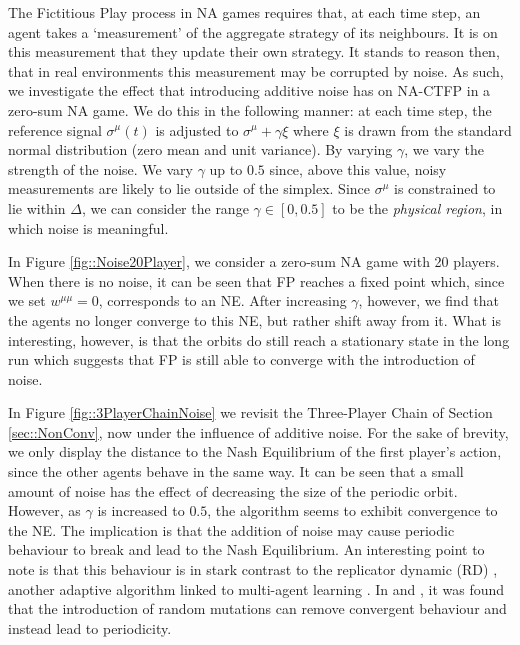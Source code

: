 \documentclass{article}
\theoremstyle{definition}
\newcommand{\refmu}{\sigma^{\mu}}
\begin{document}
  The Fictitious Play process in NA games requires that, at each time step, an agent takes a
  `measurement' of the aggregate strategy of its neighbours. It is on this measurement that they
  update their own strategy. It stands to reason then, that in real environments this measurement
  may be corrupted by noise. 
%  
  As such, we investigate the effect that introducing additive noise has
  on NA-CTFP in a zero-sum NA game. We do this in the following manner: at each time step, the
  reference signal $\refmu(t)$ is adjusted to $\refmu + \gamma \xi$ where $\xi$ is drawn from the
  standard normal distribution (zero mean and unit variance). By varying $\gamma$, we vary the
  strength of the noise. We vary $\gamma$ up to $0.5$ since, above this value, noisy measurements
  are likely to lie outside of the simplex. Since $\refmu$ is constrained to lie within $\Delta$, we
  can consider the range $\gamma \in [0, 0.5]$ to be the \emph{physical region}, in which noise is meaningful.

  In Figure \ref{fig::Noise20Player}, we consider a zero-sum NA game with 20 players. When there is
  no noise, it can be seen that FP reaches a fixed point which, since we set $w^{\mu \mu} = 0$,
  corresponds to an NE. After increasing $\gamma$, however, we find that the agents no longer
  converge to this NE, but rather shift away from it. What is interesting, however, is that the
  orbits do still reach a stationary state in the long run which suggests that FP is still able to
  converge with the introduction of noise.

  In Figure \ref{fig::3PlayerChainNoise} we revisit the Three-Player Chain of Section
  \ref{sec::NonConv}, now under the influence of additive noise. For the sake of brevity, we only
  display the distance to the Nash Equilibrium of the first player's action, since the other agents
  behave in the same way. It can be seen that a small amount of noise has the effect of decreasing
  the size of the periodic orbit. However, as $\gamma$
  is increased to $0.5$, the algorithm seems to exhibit convergence to the NE. The implication is
  that the addition of noise may cause periodic behaviour to break and lead to the Nash Equilibrium.
  An interesting point to note is that this behaviour is in stark contrast to the replicator
  dynamic (RD) \cite{Smith1982}, another adaptive algorithm linked to multi-agent learning
  \cite{Mertikopoulos2018}. In \cite{Imhof2005} and \cite{Galla2011}, it was found that the
  introduction of random mutations can remove convergent behaviour and instead lead to periodicity. 
  
\end{document}
